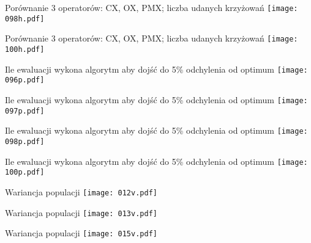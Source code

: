 \documentclass{beamer}
\begin{document}
\begin{frame}{Porównanie 3 operatorów: CX, OX, PMX; liczba udanych krzyżowań}
  \texttt{[image: 098h.pdf]}
\end{frame}

\begin{frame}{Porównanie 3 operatorów: CX, OX, PMX; liczba udanych krzyżowań}
  \texttt{[image: 100h.pdf]}
\end{frame}

\begin{frame}{Ile ewaluacji wykona algorytm aby dojść do 5\% odchylenia od optimum}
  \texttt{[image: 096p.pdf]}
\end{frame}

\begin{frame}{Ile ewaluacji wykona algorytm aby dojść do 5\% odchylenia od optimum}
  \texttt{[image: 097p.pdf]}
\end{frame}

\begin{frame}{Ile ewaluacji wykona algorytm aby dojść do 5\% odchylenia od optimum}
  \texttt{[image: 098p.pdf]}
\end{frame}

\begin{frame}{Ile ewaluacji wykona algorytm aby dojść do 5\% odchylenia od optimum}
  \texttt{[image: 100p.pdf]}
\end{frame}

\begin{frame}{Wariancja populacji}
  \texttt{[image: 012v.pdf]}
\end{frame}

\begin{frame}{Wariancja populacji}
  \texttt{[image: 013v.pdf]}
\end{frame}

\begin{frame}{Wariancja populacji}
  \texttt{[image: 015v.pdf]}
\end{frame}
\end{document}
